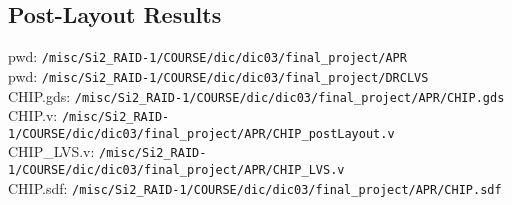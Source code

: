 \documentclass{article}
\begin{document}
        \subsection{Post-Layout Results}
            \noindent pwd: \verb|/misc/Si2_RAID-1/COURSE/dic/dic03/final_project/APR| \\
            pwd: \verb|/misc/Si2_RAID-1/COURSE/dic/dic03/final_project/DRCLVS| \\
            CHIP.gds: \verb|/misc/Si2_RAID-1/COURSE/dic/dic03/final_project/APR/CHIP.gds| \\
            CHIP.v: \verb|/misc/Si2_RAID-1/COURSE/dic/dic03/final_project/APR/CHIP_postLayout.v| \\
            CHIP\_LVS.v: \verb|/misc/Si2_RAID-1/COURSE/dic/dic03/final_project/APR/CHIP_LVS.v| \\
            CHIP.sdf: \verb|/misc/Si2_RAID-1/COURSE/dic/dic03/final_project/APR/CHIP.sdf|
\end{document}
